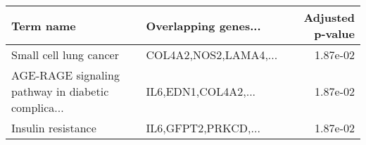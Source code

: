 \begin{tabular}{llr}
\toprule
                                         Term name &  Overlapping genes... &  Adjusted p-value \\
\midrule
                            Small cell lung cancer & COL4A2,NOS2,LAMA4,... &          1.87e-02 \\
AGE-RAGE signaling pathway in diabetic complica... &   IL6,EDN1,COL4A2,... &          1.87e-02 \\
                                Insulin resistance &   IL6,GFPT2,PRKCD,... &          1.87e-02 \\
\bottomrule
\end{tabular}
